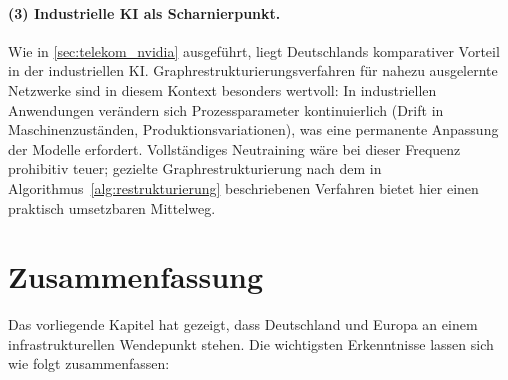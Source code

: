 ﻿\documentclass[12pt, a4paper, openany]{report}
\begin{document}
\paragraph{(3) Industrielle KI als Scharnierpunkt.}
Wie in \cref{sec:telekom_nvidia} ausgeführt, liegt Deutschlands
komparativer Vorteil in der industriellen KI. Graphrestrukturierungsverfahren
für nahezu ausgelernte Netzwerke sind in diesem Kontext besonders wertvoll:
In industriellen Anwendungen verändern sich Prozessparameter kontinuierlich
(Drift in Maschinenzuständen, Produktionsvariationen), was eine
permanente Anpassung der Modelle erfordert. Vollständiges Neutraining wäre
bei dieser Frequenz prohibitiv teuer; gezielte Graphrestrukturierung
nach dem in Algorithmus~\ref{alg:restrukturierung} beschriebenen Verfahren
bietet hier einen praktisch umsetzbaren Mittelweg.

\section{Zusammenfassung}
\label{sec:ki_infrastruktur_zusammenfassung}

Das vorliegende Kapitel hat gezeigt, dass Deutschland und Europa an einem
infrastrukturellen Wendepunkt stehen. Die wichtigsten Erkenntnisse lassen
sich wie folgt zusammenfassen:
\end{document}
